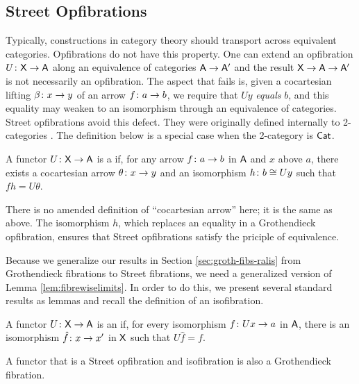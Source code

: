 \documentclass{amsart}
\begin{document}
\subsection*{Street Opfibrations}

Typically, constructions in category theory should transport across equivalent categories. Opfibrations do not have this property. One can extend an opfibration $U\colon\mathsf{X}\to\mathsf{A}$ along an equivalence of categories $\mathsf{A} \to \mathsf{A}'$ and the result $\mathsf{X}\to\mathsf{A}\to\mathsf{A}'$ is not necessarily an opfibration. The aspect that fails is, given a cocartesian lifting $\beta\colon x \to y$ of an arrow $f\colon a \to b$, we require that $Uy$ \emph{equals} $b$, and this equality may weaken to an isomorphism through an equivalence of categories. Street opfibrations avoid this defect. They were originally defined internally to 2-categories \cite{FibYon}. The definition below is a special case when the 2-category is $\mathsf{Cat}$.

\begin{defn}
  A functor $ U \colon \mathsf{X} \to \mathsf{A} $ is a  if, for any arrow $ f \colon a \to b $ in $ \mathsf{A}
  $ and $ x $ above $ a $, there exists a
  cocartesian arrow  $ \theta \colon x \to y $ and an
  isomorphism $ h \colon b \cong Uy $ such that $ fh = U\theta $.
\end{defn}

There is no amended definition of ``cocartesian arrow'' here; it is the same as above. The isomorphism $ h $, which replaces an equality in a Grothendieck opfibration, ensures that Street opfibrations satisfy the priciple of equivalence.

Because we generalize our results in Section \ref{sec:groth-fibs-ralis} from Grothendieck fibrations to Street fibrations, we need a generalized version of Lemma \ref{lem:fibrewiselimits}. In order to do this, we present several standard results as lemmas and recall the definition of an isofibration.

\begin{defn}
  A functor $U \colon \mathsf{X} \to \mathsf{A}$ is an  if, for every isomorphism $f \colon Ux \to a$ in $\mathsf{A}$, there is an isomorphism $\hat{f} \colon x \to x'$ in $\mathsf{X}$ such that $U\hat{f}=f$. 
\end{defn}

\begin{lem} \label{lem:street_and_iso_is_groth}
  A functor that is a Street opfibration and isofibration is also a Grothendieck fibration. 
\end{lem}
\end{document}
